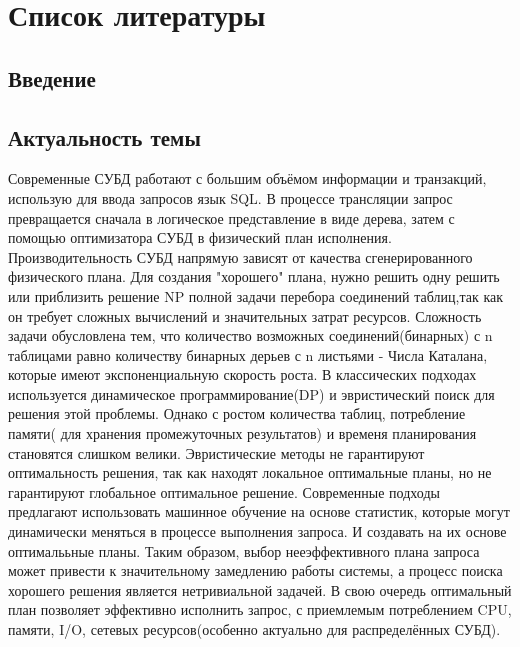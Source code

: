 \documentclass[12pt]{article}
\begin{document}
\section{Список литературы}
\newpage
\begin{center}
    \section*{Введение}
    \subsection*{Актуальность темы}
\end{center}
Современные СУБД работают с большим объёмом информации и транзакций, использую для ввода запросов язык SQL. 
В процессе трансляции запрос превращается сначала в логическое представление в виде дерева, 
затем с помощью оптимизатора СУБД в физический план исполнения. Производительность СУБД напрямую зависят от качества
сгенерированного физического плана. Для создания "хорошего" плана, нужно решить одну решить или приблизить решение
NP полной задачи перебора соединений таблиц,так как он требует сложных вычислений и значительных затрат ресурсов.
\newline
Сложность задачи обусловлена тем, что количество возможных соединений(бинарных) с n таблицами
равно количеству бинарных дерьев с n листьями - Числа Каталана, которые
имеют экспоненциальную скорость роста.
\newline
В классических подходах используется динамическое программирование(DP)
и эвристический поиск для решения этой проблемы. Однако с ростом количества таблиц,
потребление памяти( для хранения промежуточных результатов) и временя планирования становятся
слишком велики. Эвристические методы не гарантируют оптимальность решения, так как
находят локальное оптимальные планы, но не гарантируют глобальное оптимальное решение.
\newline
Современные подходы предлагают использовать машинное обучение на основе статистик,
которые могут динамически меняться в процессе выполнения запроса. И создавать на их
основе оптималььные планы.
\newline
Таким образом, выбор нееэффективного плана запроса может привести
к значительному замедлению работы системы, а процесс поиска хорошего решения является
нетривиальной задачей. В свою очередь оптимальный план позволяет эффективно исполнить
запрос, с приемлемым потреблением CPU, памяти, I/O, сетевых ресурсов(особенно актуально
для распределённых СУБД).
\end{document}
